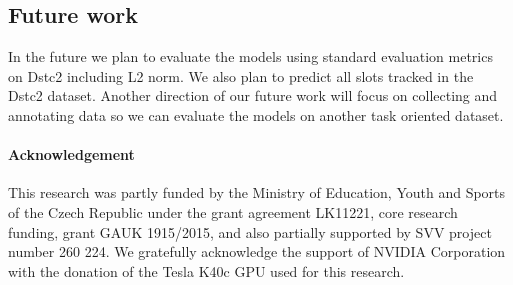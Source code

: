 \documentclass{itatnew}
\begin{document}
\subsection*{Future work}
In the future we plan to evaluate the models using standard evaluation metrics on Dstc2 including L2 norm.
We also plan to predict all slots tracked in the Dstc2 dataset.
Another direction of our future work will focus on collecting and annotating data so we can evaluate the models on another task oriented dataset.


\paragraph{Acknowledgement}
This research was partly funded by the Ministry of Education, Youth and Sports of the Czech Republic under the grant agreement LK11221, core research funding, grant GAUK 1915/2015, and also partially supported by SVV project number 260 224. 
We gratefully acknowledge the support of NVIDIA Corporation with the donation of the Tesla K40c GPU used for this research.




\end{document}
